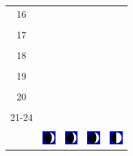 \documentclass[a4paper,12pt, tikz]{scrartcl}
\begin{document}
\begin{tabularx}{\linewidth}{|c|X|X|p{2cm}|p{2cm}|}
            &   &       &    &   \\
          \hline
          16&   &                 &    &   \\
            &   &       &    &   \\
          \hline
          17&   &                 &    &   \\
            &   &       &    &   \\
          \hline
          18&   &                 &    &   \\
            &   &       &    &   \\
          \hline
          19&   &                 &     &   \\
            &   &       &    &   \\
          \hline
          20&   &              &    &   \\
            &   &       &    &   \\
          \hline 
          21-24&   &              &    &   \\
            &   &       &    &   \\
          \hline
                      & \vspace{0.01cm} \centerline{\includegraphics[width=0.5cm]{moon_phases/Moon_phase_1.svg.png}} \vspace{0.1cm} & \vspace{0.01cm} \centerline{\includegraphics[width=0.5cm]{moon_phases/Moon_phase_1.svg.png}} \vspace{0.1cm} & \vspace{0.01cm} \centerline{\includegraphics[width=0.5cm]{moon_phases/Moon_phase_1.svg.png}} \vspace{0.1cm} & \vspace{0.01cm} \centerline{\includegraphics[width=0.5cm]{moon_phases/Moon_phase_2.svg.png}} \vspace{0.1cm}\\
          \hline    
        \end{tabularx}

\newpage
\end{document}

